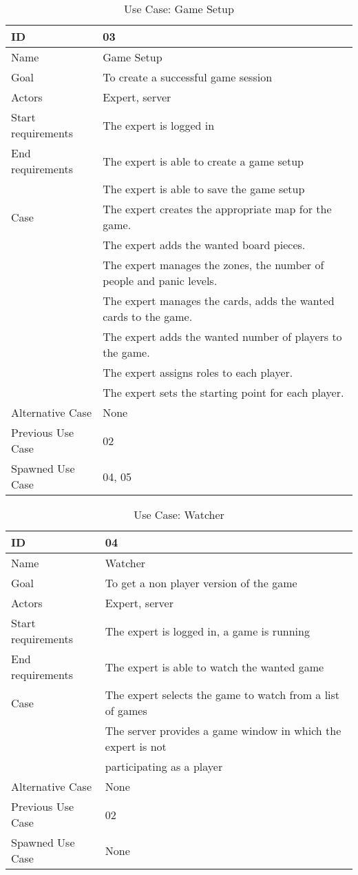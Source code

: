 \begin{table}[H]
\begin{tabular}{|l|l|} \hline
	ID & 03\\ \hline
	Name & Game Setup\\ \hline
	Goal & To create a successful game session\\ \hline
	Actors & Expert, server\\ \hline
	Start requirements & The expert is logged in\\ \hline
	End requirements & The expert is able to create a game setup \\ 
						& The expert is able to save the game setup\\ \hline
	Case & The expert creates the appropriate map for the game.\\
			& The expert adds the wanted board pieces.\\
			& The expert manages the zones, the number of people and panic levels.\\
			& The expert manages the cards, adds the wanted cards to the game.\\
			& The expert adds the wanted number of players to the game.\\
			& The expert assigns roles to each player. \\
			& The expert sets the starting point for each player.\\ \hline
	Alternative Case & None \\ \hline
	Previous Use Case & 02\\ \hline
	Spawned Use Case & 04, 05\\ \hline
\end{tabular}
\caption{Use Case: Game Setup}
\label{fig:usecase03table}
\end{table}

\begin{table}[H]
\begin{tabular}{|l|l|}
\hline
	ID & 04\\ \hline
	Name & Watcher\\ \hline
	Goal & To get a non player version of the game\\ \hline
	Actors & Expert, server\\ \hline
	Start requirements & The expert is logged in, a game is running \\ \hline
	End requirements & The expert is able to watch the wanted game\\ \hline
	Case & The expert selects the game to watch from a list of games\\
		 & The server provides a game window in which the expert is not\\ 
		 & participating as a player\\ \hline
	Alternative Case & None \\ \hline
	Previous Use Case & 02\\ \hline
	Spawned Use Case & None\\ \hline
\end{tabular}
\caption{Use Case: Watcher}
\label{fig:usecase04table}
\end{table}

